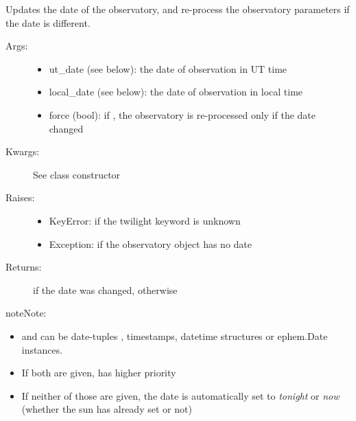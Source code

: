\documentclass[letterpaper,10pt,english]{sphinxmanual}
\begin{document}
\begin{fulllineitems}
\begin{fulllineitems}
\end{fulllineitems}


\begin{fulllineitems}
\label{astroobs:astroobs.Observatory.upd_date}
Updates the date of the observatory, and re-process the observatory parameters if the date is different.
\begin{description}
\item[{Args:}] \leavevmode\begin{itemize}
\item {} 
ut\_date (see below): the date of observation in UT time

\item {} 
local\_date (see below): the date of observation in local time

\item {} 
force (bool): if , the observatory is re-processed only if the date changed

\end{itemize}

\item[{Kwargs:}] \leavevmode
See class constructor

\item[{Raises:}] \leavevmode\begin{itemize}
\item {} 
KeyError: if the twilight keyword is unknown

\item {} 
Exception: if the observatory object has no date

\end{itemize}

\item[{Returns:}] \leavevmode
{} if the date was changed, otherwise 

\end{description}

\begin{notice}{note}{Note:}\begin{itemize}
\item {} 
 and  can be date-tuples , timestamps, datetime structures or ephem.Date instances.

\item {} 
If both are given,  has higher priority

\item {} 
If neither of those are given, the date is automatically set to \emph{tonight} or \emph{now} (whether the sun has already set or not)

\end{itemize}
\end{notice}

\end{fulllineitems}


\end{fulllineitems}
\end{document}
